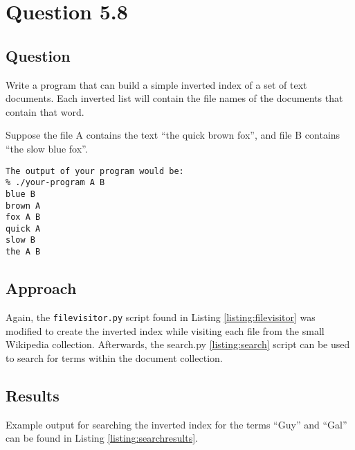 \section{Question 5.8}

\subsection{Question}
Write a program that can build a simple inverted index of a set of text documents. Each inverted list will contain the file names of the documents that contain that word.

Suppose the file A contains the text ``the quick brown fox'', and file B contains ``the slow blue fox''. 

\begin{verbatim}
The output of your program would be:
% ./your-program A B
blue B
brown A
fox A B
quick A
slow B
the A B
\end{verbatim}

\subsection{Approach}
Again, the \texttt{filevisitor.py} script found in Listing \ref{listing:filevisitor} was modified to create the inverted index while visiting each file from the small Wikipedia collection.  Afterwards, the search.py \ref{listing:search} script can be used to search for terms within the document collection.

\subsection{Results}
Example output for searching the inverted index for the terms ``Guy'' and ``Gal'' can be found in Listing \ref{listing:searchresults}.\\


